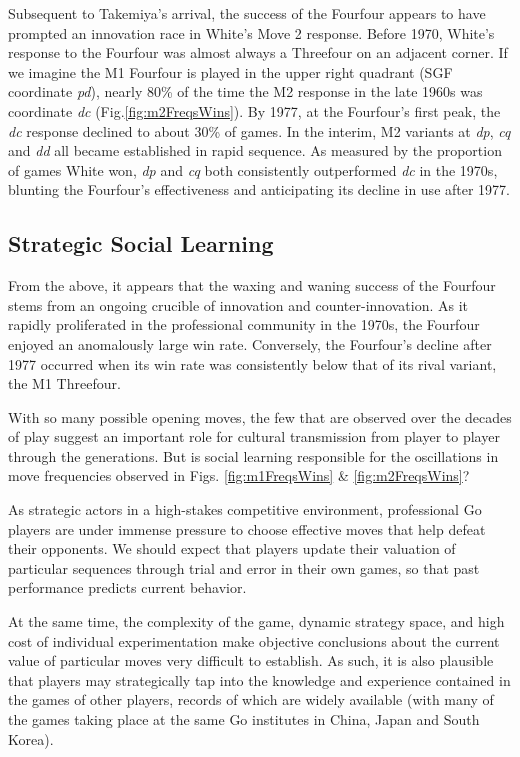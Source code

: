 \documentclass[reqno,12pt]{amsart}
\begin{document}
Subsequent to Takemiya's arrival, the success of the Fourfour appears to have prompted an innovation race in White's Move 2 response. Before 1970, White's response to the Fourfour was almost always a Threefour on an adjacent corner. If we imagine the M1 Fourfour is played in the upper right quadrant (SGF coordinate \textit{pd}), nearly 80\% of the time the M2 response in the late 1960s was coordinate \textit{dc} (Fig.\;\ref{fig:m2FreqsWins}). By 1977, at the Fourfour's first peak, the \textit{dc} response declined to about 30\% of games. In the interim, M2 variants at \textit{dp}, \textit{cq} and \textit{dd} all became established in rapid sequence. As measured by the proportion of games White won, \textit{dp} and \textit{cq} both consistently outperformed \textit{dc} in the 1970s, blunting the Fourfour's effectiveness and anticipating its decline in use after 1977.

\subsection{Strategic Social Learning}

From the above, it appears that the waxing and waning success of the Fourfour stems from an ongoing crucible of innovation and counter-innovation. As it rapidly proliferated in the professional community in the 1970s, the Fourfour enjoyed an anomalously large win rate. Conversely, the Fourfour's decline after 1977 occurred when its win rate was consistently below that of its rival variant, the M1 Threefour.

With so many possible opening moves, the few that are observed over the decades of play suggest an important role for cultural transmission from player to player through the generations. But is social learning responsible for the oscillations in move frequencies observed in Figs. \ref{fig:m1FreqsWins} \& \ref{fig:m2FreqsWins}?

As strategic actors in a high-stakes competitive environment, professional Go players are under immense pressure to choose effective moves that help defeat their opponents. We should expect that players update their valuation of particular sequences through trial and error in their own games, so that past performance predicts current behavior.

At the same time, the complexity of the game, dynamic strategy space, and high cost of individual experimentation make objective conclusions about the current value of particular moves very difficult to establish. As such, it is also plausible that players may strategically tap into the knowledge and experience contained in the games of other players, records of which are widely available (with many of the games taking place at the same Go institutes in China, Japan and South Korea).
\end{document}
